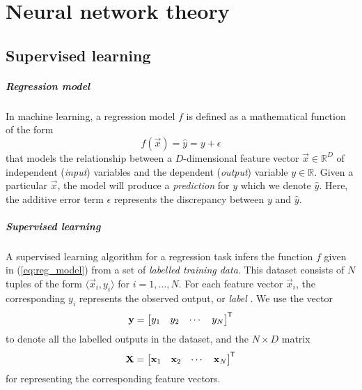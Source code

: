 \chapter{Neural network theory}
\section{Supervised learning}

\paragraph{Regression model}
In machine learning, a regression model $f$ is defined as a mathematical function of the form
\begin{equation}
    \label{eq:reg_model}
    f(\vec{x}) = \hat{y} = y + \epsilon
\end{equation}
that models the relationship between a $D$-dimensional feature vector $\vec{x} \in \mathbb{R}^D$ of independent (\textit{input}) variables and the dependent (\textit{output}) variable $y \in \mathbb{R}$. 
Given a particular $\vec{x}$, the model will produce a \textit{prediction} for $y$ which we denote $\hat{y}$.
Here, the additive error term $\epsilon$ represents the discrepancy between $y$ and $\hat{y}$.

\paragraph{Supervised learning}
A supervised learning algorithm for a regression task infers the function $f$ given in (\ref{eq:reg_model}) from a set of \textit{labelled training data}. This dataset consists of $N$ tuples of the form $\langle \vec{x}_i, y_i\rangle$ for $i=1,\dots,N$.
For each feature vector $\vec{x}_i$, the corresponding $y_i$ represents the observed output, or \textit{label} \cite{burkov2019}.
We use the vector
\begin{equation}
    \mathbf{y} = \begin{bmatrix}
        y_1 & y_2 & \cdots & y_N
    \end{bmatrix}^{\mkern-1.5mu\mathsf{T}}
\end{equation}
to denote all the labelled outputs in the dataset, and the $N \times D$ matrix
\begin{equation}
    \mathbf{X} = \begin{bmatrix}
        \mathbf{x}_1 & \mathbf{x}_2 & \cdots & \mathbf{x}_N
    \end{bmatrix}^{\mkern-1.5mu\mathsf{T}}
\end{equation}
for representing the corresponding feature vectors.

